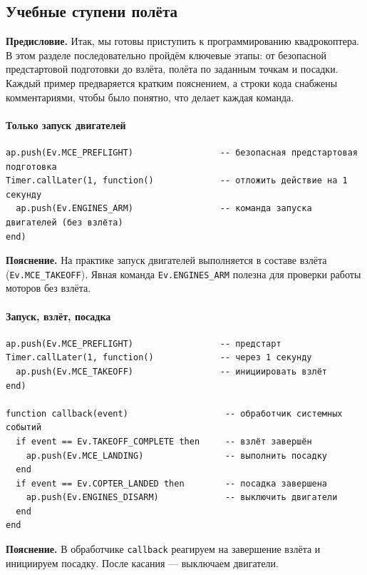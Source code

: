 \subsection{Учебные ступени полёта}
\textbf{Предисловие.} Итак, мы готовы приступить к программированию квадрокоптера. В этом разделе последовательно пройдём ключевые этапы: от безопасной предстартовой подготовки до взлёта, полёта по заданным точкам и посадки. Каждый пример предваряется кратким пояснением, а строки кода снабжены комментариями, чтобы было понятно, что делает каждая команда.
\paragraph{Только запуск двигателей}
\begin{verbatim}
ap.push(Ev.MCE_PREFLIGHT)                 -- безопасная предстартовая подготовка
Timer.callLater(1, function()             -- отложить действие на 1 секунду
  ap.push(Ev.ENGINES_ARM)                 -- команда запуска двигателей (без взлёта)
end)
\end{verbatim}
\textbf{Пояснение.} На практике запуск двигателей выполняется в составе взлёта (\texttt{Ev.MCE\_TAKEOFF}). Явная команда \texttt{Ev.ENGINES\_ARM} полезна для проверки работы моторов без взлёта.

\paragraph{Запуск, взлёт, посадка}
\begin{verbatim}
ap.push(Ev.MCE_PREFLIGHT)                 -- предстарт
Timer.callLater(1, function()             -- через 1 секунду
  ap.push(Ev.MCE_TAKEOFF)                 -- инициировать взлёт
end)

function callback(event)                   -- обработчик системных событий
  if event == Ev.TAKEOFF_COMPLETE then     -- взлёт завершён
    ap.push(Ev.MCE_LANDING)                -- выполнить посадку
  end
  if event == Ev.COPTER_LANDED then        -- посадка завершена
    ap.push(Ev.ENGINES_DISARM)             -- выключить двигатели
  end
end
\end{verbatim}
\textbf{Пояснение.} В обработчике \texttt{callback} реагируем на завершение взлёта и инициируем посадку. После касания — выключаем двигатели.

